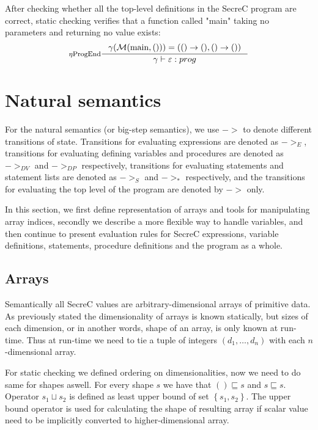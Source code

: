 \documentclass[a4paper, 10pt, draft]{report}
\newcommand{\mycode}[1]{\ensuremath{\mbox{\lstinline{#1}}}}
\begin{document}
After checking whether all the top-level definitions in the SecreC program are
correct, static checking verifies that a function called "main" taking no
parameters and returning no value exists:
\[ \inference[$\eta$ProgEnd]{
  \gamma(\mathcal{M}(\mycode{main}, ())) = ( ()\to(), ()\to())
}{
  \gamma |- \varepsilon : prog
} \]

\chapter{Natural semantics}\label{sec:semantics}

For the natural semantics (or big-step semantics), we use $->$ to denote
different transitions of state. Transitions for evaluating expressions are
denoted as $->_E$, transitions for evaluating defining variables and procedures
are denoted as $->_{DV}$ and $->_{DP}$ respectively, transitions for evaluating
statements and statement lists are denoted as $->_S$ and $->_{*}$ respectively,
and the transitions for evaluating the top level of the program are denoted by
$->$ only.

In this section, we first define representation of arrays and tools for
manipulating array indices, secondly we describe a more flexible way to handle
variables, and then continue to present evaluation rules for SecreC
expressions, variable definitions, statements, procedure definitions and the
program as a whole.

\section{Arrays}\label{sec:semantics:arrays}

Semantically all SecreC values are arbitrary-dimensional arrays of primitive
data.  As previously stated the dimensionality of arrays is known statically,
but sizes of each dimension, or in another words, shape of an array, is only
known at run-time. Thus at run-time we need to tie a tuple of integers $(d_1,
\ldots, d_n)$ with each $n$-dimensional array.

For static checking we defined ordering on dimensionalities, now we need to do
same for shapes aswell. For every shape $s$ we have that $() \sqsubseteq s$ and
$s \sqsubseteq s$. Operator $s_1 \sqcup s_2$ is defined as least upper bound of
set $\left\{ s_1, s_2 \right\}$. The upper bound operator is used for
calculating the shape of resulting array if scalar value need to be implicitly
converted to higher-dimensional array.
\end{document}
